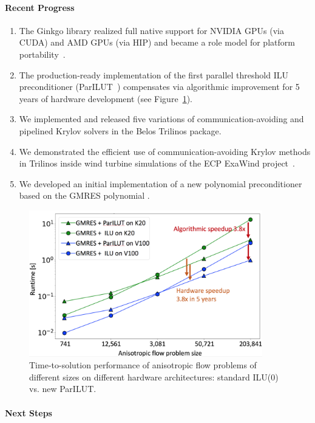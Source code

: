 \paragraph{Recent Progress}
\begin{enumerate}
\item 
The Ginkgo library realized full native support for NVIDIA GPUs (via CUDA) and 
AMD GPUs (via HIP) and became a role model for platform 
portability~\cite{tsai2020preparing}.
\item 
The production-ready implementation of the first parallel threshold ILU 
preconditioner (ParILUT~\cite{ipdps_anzt}) compensates via algorithmic 
improvement for 5 years of hardware development (see 
Figure~\ref{fig:ParILUTperf}).
\item
We implemented and released five variations of communication-avoiding
and pipelined Krylov solvers in the Belos Trilinos package.
\item
We demonstrated the efficient use of communication-avoiding Krylov methods in Trilinos inside wind turbine simulations of the ECP ExaWind 
project~\cite{Yamazaki-lowsynch}.
\item
We developed an initial implementation of a new polynomial preconditioner based on the GMRES polynomial \cite{LoeThornquistBoman20}.
\end{enumerate}

\begin{figure}[htb]
	\centering
	\includegraphics[width=4in]{../../../projects/2.3.3-MathLibs/2.3.3.13-CLOVER/parilut_speedup}
	\caption{\label{fig:ParILUTperf}Time-to-solution performance of anisotropic 
	flow problems of different sizes on different hardware architectures: 
	standard ILU(0) vs. new ParILUT.}
\end{figure}


\paragraph{Next Steps}


